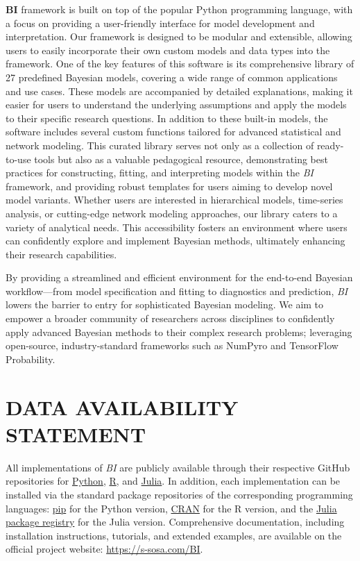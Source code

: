 \documentclass[num-refs]{wiley-article}
\begin{document}
\textbf{BI} framework is built on top of the popular Python programming language, with a focus on providing a user-friendly interface for model development and interpretation. Our framework is designed to be modular and extensible, allowing users to easily incorporate their own custom models and data types into the framework. One of the key features of this software is its comprehensive library of 27 predefined Bayesian models, covering a wide range of common applications and use cases. These models are accompanied by detailed explanations, making it easier for users to understand the underlying assumptions and apply the models to their specific research questions. In addition to these built-in models, the software includes several custom functions tailored for advanced statistical and network modeling. This curated library serves not only as a collection of ready-to-use tools but also as a valuable pedagogical resource, demonstrating best practices for constructing, fitting, and interpreting models within the \textit{BI} framework, and providing robust templates for users aiming to develop novel model variants. Whether users are interested in hierarchical models, time-series analysis, or cutting-edge network modeling approaches, our library caters to a variety of analytical needs. This accessibility fosters an environment where users can confidently explore and implement Bayesian methods, ultimately enhancing their research capabilities.

By providing a streamlined and efficient environment for the end-to-end Bayesian workflow—from model specification and fitting to diagnostics and prediction, \textit{BI} lowers the barrier to entry for sophisticated Bayesian modeling. We aim to empower a broader community of researchers across disciplines to confidently apply advanced Bayesian methods to their complex research problems; leveraging open-source, industry-standard frameworks such as NumPyro and TensorFlow Probability.



\section*{DATA AVAILABILITY STATEMENT}
All implementations of \textit{BI} are publicly available through their respective
GitHub repositories for \href{https://github.com/BGN-for-ASNA/BI}{Python},
\href{https://github.com/BGN-for-ASNA/BIR}{R}, and
\href{https://github.com/BGN-for-ASNA/BIJ}{Julia}. In addition, each implementation
can be installed via the standard package repositories of the corresponding
programming languages: 
\href{https://pypi.org/project/BayesInference/}{pip} for the Python version, \href{https://cran.r-project.org/web/packages/BayesSIM/index.html}{CRAN} for the R
version, and the \href{https://juliapackages.com/p/PyBaeysianInference}{Julia package registry} for the Julia version. Comprehensive documentation, including installation instructions, tutorials, and
extended examples, are available on the official project website:
\href{https://s-sosa.com/BI}{https://s-sosa.com/BI}.
\end{document}
